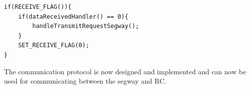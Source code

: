 \begin{lstlisting}
if(RECEIVE_FLAG()){
	if(dataReceivedHandler() == 0){
		handleTransmitRequestSegway();
	}
	SET_RECEIVE_FLAG(0);
}
\end{lstlisting}

The communication protocol is now designed and implemented and can now be used for communicating between the segway and RC.












